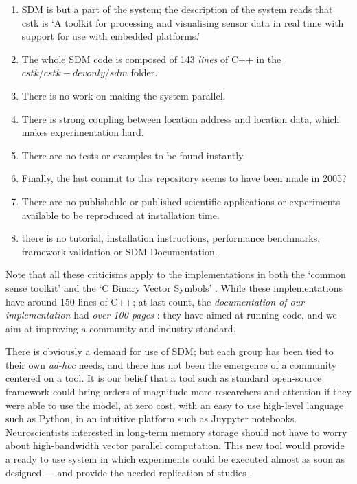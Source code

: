 \begin{enumerate}
    \item SDM is but a part of the system; the description of the system reads that cstk is `A toolkit for processing and visualising sensor data in real time with support for use with embedded platforms.'

    \item The whole SDM code is composed of 143 \emph{lines} of C++ in the $cstk/cstk-devonly/sdm$ folder.

    \item There is no work on making the system parallel.

    \item There is strong coupling between location address and location data, which makes experimentation hard.

    \item There are no tests or examples to be found instantly.

    \item Finally, the last commit to this repository seems to have been made in 2005?

    \item There are no publishable or published scientific applications or experiments available to be reproduced at installation time.

    \item there is no tutorial, installation instructions, performance benchmarks, framework validation or SDM Documentation.

\end{enumerate}

Note that all these criticisms apply to the implementations in both the `common sense toolkit' and the `C Binary Vector Symbols' \citep{berchtold_processing_2005, noauthor_cstk:_nodate, emruli_vector_2015}.  While these implementations have around 150 lines of C++; at last count, the \emph{documentation of our implementation} had \emph{over 100 pages} \citep{linhares_sparse_2018}: they have aimed at running code, and we aim at improving a community and industry standard.

There is obviously a demand for use of SDM; but each group has been tied to their own \emph{ad-hoc} needs, and there has not been the emergence of a community centered on a tool. It is our belief that a tool such as standard open-source framework could bring orders of magnitude more researchers and attention if they were able to use the model, at zero cost, with an easy to use high-level language such as Python, in an intuitive platform such as Juypyter notebooks. Neuroscientists interested in long-term memory storage should not have to worry about high-bandwidth vector parallel computation.  This new tool would provide a ready to use system in which experiments could be executed almost as soon as designed --- and provide the needed replication of studies \citep{shen2014interactive}.

